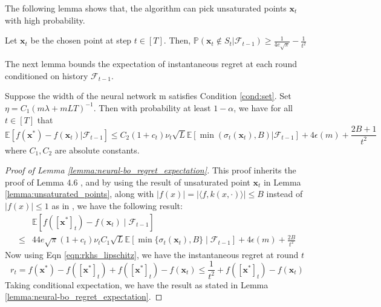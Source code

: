 The following lemma shows that, the algorithm can pick unsaturated points $\mathbf{x}_t$ with high probability. 
\begin{lemma}
\label{lemma:unsaturated_points}

Let $\mathbf{x}_t$ be the chosen point at step $t \in [T]$. Then, $\mathbb{P}(\mathbf{x}_t \not\in S_t \lvert \mathcal{F}_{t-1}) \geq \frac{1}{4e\sqrt{\pi}} - \frac{1}{t^2}$
\end{lemma}

The next lemma bounds the expectation of instantaneous regret at each round conditioned on history $\mathcal{F}_{t-1}$.

\begin{lemma}
\label{lemma:neural-bo_regret_expectation}
Suppose the width of the neural network m satisfies Condition \ref{cond:set}. Set $\eta = C_1(m\lambda + mLT)^{-1}$. Then with probability at least $1- \alpha$, we have for all $t \in [T]$ that
\begin{equation*}
\mathbb{E}[f(\mathbf{x}^*) - f(\mathbf{x}_t) \lvert \mathcal{F}_{t-1}] \leq C_2 (1+c_t)\nu_t \sqrt{L} \mathbb{E}[ \min(\sigma_t(\mathbf{x}_t),B)\lvert\mathcal{F}_{t-1}] + 4\epsilon(m) + \frac{2B+1}{t^2}
\end{equation*}
where $C_1, C_2$ are absolute constants.
\end{lemma}

\begin{proof} [Proof of Lemma \ref{lemma:neural-bo_regret_expectation}]
     
This proof inherits the proof of Lemma 4.6 \cite{zhang2021neural}, and by using the result of unsaturated point $\mathbf{x}_t$ in Lemma \ref{lemma:unsaturated_points}, along with $\lvert f(x)  \rvert = \lvert \langle f, k(x,\cdot) \rangle \rvert \leq B$ instead of $\lvert f(x) \rvert  \leq 1$ as in \cite{zhang2021neural}, we have the following result:
\begin{equation*}
\begin{split}
    &  \mathbb{E} [f([\mathbf{x}^*]_t) - f(\mathbf{x}_t) \mid \mathcal{F}_{t-1}] \\
    \leq  & 44e\sqrt{\pi}(1+c_t )\nu_t C_1\sqrt {L} \mathbb{E}[\min \{\sigma_t(\mathbf{x}_t),B\} \mid \mathcal{F}_{t-1}] + 4\epsilon(m) + \frac{2B}{t^2}
\end{split}
\end{equation*}
Now using Eqn \ref{eqn:rkhs_lipschitz}, we have the instantaneous regret at round $t$
\[
r_t = f(\mathbf{x}^*) - f([\mathbf{x}^*]_t) + f([\mathbf{x}^*]_t) - f(\mathbf{x}_t) \leq \frac{1}{t^2} + f([\mathbf{x}^*]_t) - f(\mathbf{x}_t)
\]
Taking conditional expectation, we have the result as stated in Lemma \ref{lemma:neural-bo_regret_expectation}.

\end{proof}


